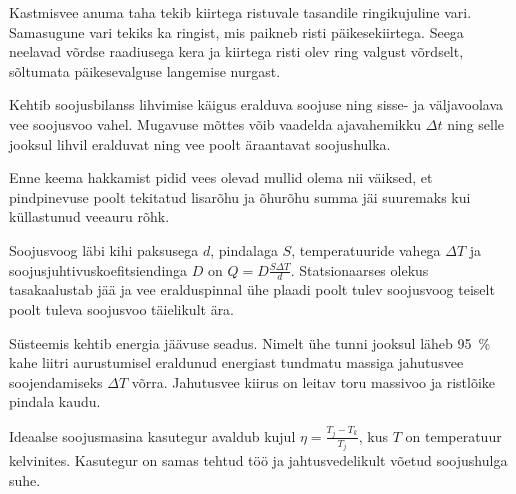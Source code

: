 \documentclass[10pt]{article}
\begin{document}
{
\hint
Kastmisvee anuma taha tekib kiirtega ristuvale tasandile ringikujuline vari. Samasugune vari tekiks ka ringist, mis paikneb risti päikesekiirtega. Seega neelavad võrdse raadiusega kera ja kiirtega risti olev ring valgust võrdselt, sõltumata päikesevalguse langemise nurgast.
\probend
\bigskip


\hint
Kehtib soojusbilanss lihvimise käigus eralduva soojuse ning sisse- ja väljavoolava vee soojusvoo vahel. Mugavuse mõttes võib vaadelda ajavahemikku $\Delta t$ ning selle jooksul lihvil eralduvat ning vee poolt äraantavat soojushulka.
\probend
\bigskip


\hint
Enne keema hakkamist pidid vees olevad mullid olema nii väiksed, et pindpinevuse poolt tekitatud lisarõhu ja õhurõhu summa jäi suuremaks kui küllastunud veeauru rõhk.
\probend
\bigskip


\hint
Soojusvoog läbi kihi paksusega $d$, pindalaga $S$, temperatuuride vahega $\Delta T$ ja soojusjuhtivuskoefitsiendinga $D$ on $Q = D\frac{S\Delta T}{d}$. Statsionaarses olekus tasakaalustab jää ja vee eralduspinnal ühe plaadi poolt tulev soojusvoog teiselt poolt tuleva soojusvoo täielikult ära.
\probend
\bigskip


\hint
Süsteemis kehtib energia jäävuse seadus. Nimelt ühe tunni jooksul läheb \SI{95}{\%} kahe liitri aurustumisel eraldunud energiast tundmatu massiga jahutusvee soojendamiseks $\Delta T$ võrra. Jahutusvee kiirus on leitav toru massivoo ja ristlõike pindala kaudu.
\probend
\bigskip


\hint
Ideaalse soojusmasina kasutegur avaldub kujul $\eta = \frac{T_{j} - T_{k}}{T_{j}}$, kus $T$ on temperatuur kelvinites. Kasutegur on samas tehtud töö ja jahtusvedelikult võetud soojushulga suhe.
\probend
\bigskip

}
\end{document}
